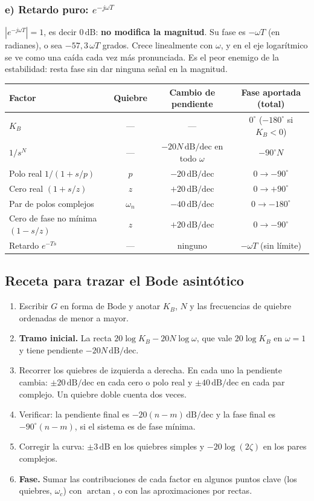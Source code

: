\documentclass[11pt,a4paper]{article}
\newcommand{\dB}{\,\mathrm{dB}}
\newcommand{\dBdec}{\,\mathrm{dB/dec}}
\newcommand{\jw}{j\omega}
\newcommand{\wc}{\omega_c}
\begin{document}
\subsubsection{e) Retardo puro: $e^{-\jw T}$}
$|e^{-\jw T}|=1$, es decir $0\dB$: \textbf{no modifica la magnitud}. Su fase es $-\omega T$ (en radianes), o sea
$-57{,}3\,\omega T$ grados. Crece linealmente con $\omega$, y en el eje logarítmico se ve como una caída cada
vez más pronunciada. Es el peor enemigo de la estabilidad: resta fase sin dar ninguna señal en la magnitud.

\begin{center}
\small
\begin{tabular}{@{}lccc@{}}
\toprule
Factor & Quiebre & Cambio de pendiente & Fase aportada (total)\\
\midrule
$K_B$ & --- & --- & $0^\circ$ ($-180^\circ$ si $K_B<0$)\\
$1/s^N$ & --- & $-20N\dBdec$ en todo $\omega$ & $-90^\circ N$\\
Polo real $1/(1+s/p)$ & $p$ & $-20\dBdec$ & $0\to-90^\circ$\\
Cero real $(1+s/z)$ & $z$ & $+20\dBdec$ & $0\to+90^\circ$\\
Par de polos complejos & $\omega_n$ & $-40\dBdec$ & $0\to-180^\circ$\\
Cero de fase no mínima $(1-s/z)$ & $z$ & $+20\dBdec$ & $0\to-90^\circ$\\
Retardo $e^{-Ts}$ & --- & ninguno & $-\omega T$ (sin límite)\\
\bottomrule
\end{tabular}
\end{center}

\subsection{Receta para trazar el Bode asintótico}
\begin{receta}
\begin{enumerate}[label=\textbf{\arabic*.}]
\item Escribir $G$ en forma de Bode y anotar $K_B$, $N$ y las frecuencias de quiebre ordenadas de menor a mayor.
\item \textbf{Tramo inicial.} La recta $20\log K_B-20N\log\omega$, que vale $20\log K_B$ en $\omega=1$
      y tiene pendiente $-20N\dBdec$.
\item Recorrer los quiebres de izquierda a derecha. En cada uno la pendiente cambia: $\pm20\dBdec$ en cada cero o polo
      real y $\pm40\dBdec$ en cada par complejo. Un quiebre doble cuenta dos veces.
\item Verificar: la pendiente final es $-20(n-m)\dBdec$ y la fase final es $-90^\circ(n-m)$, si el sistema es de fase mínima.
\item Corregir la curva: $\pm3\dB$ en los quiebres simples y $-20\log(2\zeta)$ en los pares complejos.
\item \textbf{Fase.} Sumar las contribuciones de cada factor en algunos puntos clave (los quiebres, $\wc$)
      con $\arctan$, o con las aproximaciones por rectas.
\end{enumerate}
\end{receta}
\end{document}
